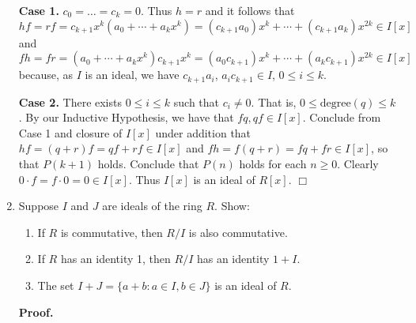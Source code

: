 \documentclass[9pt]{article}
\newcommand{\qed}{\hfill \ensuremath{\Box}}
\begin{document}
\begin{enumerate}
      \textbf{Case 1.} $c_0 = \ldots = c_k = 0$. Thus $h = r$ and it follows
      that
      $$hf = rf = c_{k+1}x^k(a_0 + \cdots + a_kx^k) = (c_{k+1}a_0)x^k + \cdots +
         (c_{k+1}a_k)x^{2k} \in I[x]$$
      and
      $$fh = fr = (a_0 + \cdots + a_kx^k)c_{k+1}x^k = (a_0c_{k+1})x^k + \cdots +
         (a_kc_{k+1})x^{2k} \in I[x]$$
      because, as $I$ is an ideal, we have
      $c_{k+1}a_i$, $a_ic_{k+1} \in I$, $0 \le i \le k$.

      \textbf{Case 2.} There exists $0 \le i \le k$ such that $c_i \neq 0$. That 
      is, $0 \le \text{degree}(q) \le k$. By our Inductive Hypothesis, we have
      that $fq, qf \in I[x]$. Conclude from Case 1 and closure of $I[x]$ under
      addition that $hf = (q + r)f = qf +  rf \in I[x]$ and
      $fh = f(q + r) = fq + fr \in I[x]$, so that $P(k + 1)$ holds. Conclude
      that $P(n)$ holds for each $n \ge 0$. Clearly
      $0 \cdot f = f \cdot 0 = 0 \in I[x]$. Thus $I[x]$ is an ideal of $R[x]$.
      \qed
   \item Suppose $I$ and $J$ are ideals of the ring $R$. Show:
         \begin{enumerate}
            \item If $R$ is commutative, then $R/I$ is also commutative.
            \item If $R$ has an identity 1, then $R/I$ has an identity $1 + I$.
            \item The set $I + J = \{a + b: a \in I, b \in J\}$ is an ideal of
                  $R$.
         \end{enumerate}
         
      \textbf{Proof.}
      

\end{enumerate}
\end{document}
